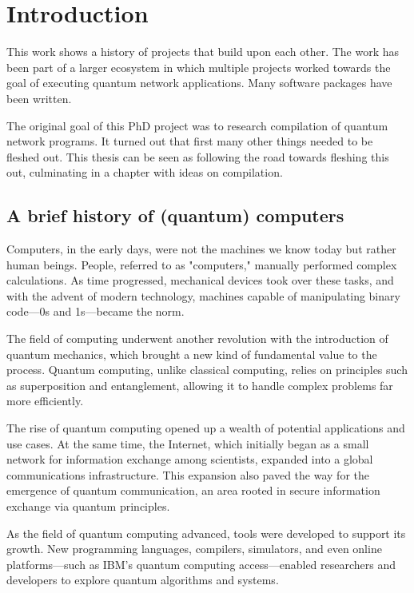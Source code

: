\chapter{Introduction}
\label{chp:intro}

This work shows a history of projects that build upon each other.
The work has been part of a larger ecosystem in which multiple projects worked towards the goal of executing quantum network applications.
Many software packages have been written.

The original goal of this PhD project was to research compilation of quantum network programs.
It turned out that first many other things needed to be fleshed out.
This thesis can be seen as following the road towards fleshing this out, culminating in a chapter with ideas on compilation.

\section{A brief history of (quantum) computers}

Computers, in the early days, were not the machines we know today but rather human beings.
People, referred to as "computers," manually performed complex calculations.
As time progressed, mechanical devices took over these tasks, and with the advent of modern technology, machines capable of manipulating binary code—0s and 1s—became the norm.

The field of computing underwent another revolution with the introduction of quantum mechanics, which brought a new kind of fundamental value to the process.
Quantum computing, unlike classical computing, relies on principles such as superposition and entanglement, allowing it to handle complex problems far more efficiently.

The rise of quantum computing opened up a wealth of potential applications and use cases.
At the same time, the Internet, which initially began as a small network for information exchange among scientists, expanded into a global communications infrastructure.
This expansion also paved the way for the emergence of quantum communication, an area rooted in secure information exchange via quantum principles.

As the field of quantum computing advanced, tools were developed to support its growth.
New programming languages, compilers, simulators, and even online platforms—such as IBM's quantum computing access—enabled researchers and developers to explore quantum algorithms and systems.

